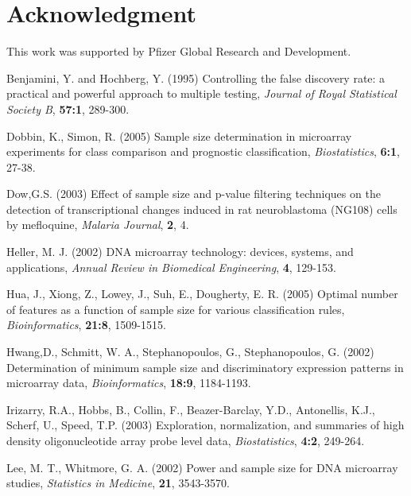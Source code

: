 \documentclass[12pt]{article}
\begin{document}
\section*{Acknowledgment}

This work was supported by Pfizer Global Research and Development.


\begin{thebibliography}{}

 Benjamini, Y.
  and Hochberg, Y. (1995) Controlling the false discovery rate: a
  practical and powerful approach to multiple testing, {\it Journal
  of Royal Statistical Society B}, {\bf 57:1}, 289-300.

 Dobbin, K., Simon, R. (2005)
  Sample size determination in microarray experiments for class comparison and prognostic classification,
  {\it Biostatistics}, {\bf 6:1}, 27-38.

 Dow,G.S. (2003) Effect of sample size
  and p-value filtering techniques on the detection of
  transcriptional changes induced in rat neuroblastoma (NG108) cells
  by mefloquine, {\it Malaria Journal}, {\bf 2}, 4.

 Heller, M. J. (2002) {DNA
  microarray technology: devices, systems, and applications}, {\it
  Annual Review in Biomedical Engineering}, {\bf 4}, 129-153.

 Hua, J., Xiong, Z., Lowey, J., Suh, E., Dougherty, E. R. (2005)
  Optimal number of features as a function of sample size for various classification rules,
  {\it Bioinformatics}, {\bf 21:8}, 1509-1515.

 Hwang,D., Schmitt,
  W. A., Stephanopoulos, G., Stephanopoulos, G. (2002) Determination
  of minimum sample size and discriminatory expression patterns in
  microarray data, {\it Bioinformatics}, {\bf 18:9}, 1184-1193.

 Irizarry, R.A.,
  Hobbs, B., Collin, F., Beazer-Barclay, Y.D., Antonellis, K.J.,
  Scherf, U., Speed, T.P. (2003) Exploration, normalization, and
  summaries of high density oligonucleotide array probe level data,
  {\it Biostatistics}, {\bf 4:2}, 249-264.

 Lee, M. T., Whitmore, G. A. (2002)
  Power and sample size for DNA microarray studies, {\it Statistics in Medicine}, {\bf 21}, 3543-3570.


\end{thebibliography}
\end{document}

